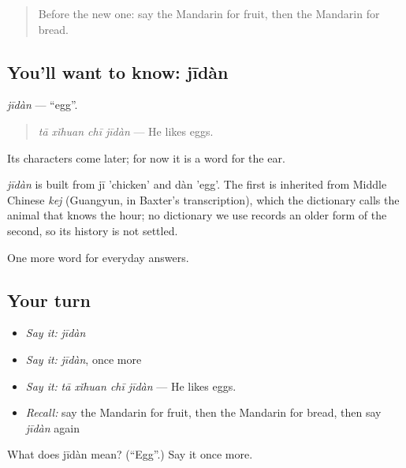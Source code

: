 \label{lesson:ZH-C40-jidan}



\begin{quote}
Before the new one: say the Mandarin for fruit, then the Mandarin for bread.
\end{quote}

\subsection*{You'll want to know: jīdàn}
\emph{jīdàn} — \textquotedblleft{}egg\textquotedblright{}.

\begin{quote}
\emph{tā xǐhuan chī jīdàn} — He likes eggs.
\end{quote}

Its characters come later; for now it is a word for the ear.

\begin{cousinweb}
\emph{jīdàn} is built from jī 'chicken' and dàn 'egg'. The first is inherited from Middle Chinese \emph{kej} (Guangyun, in Baxter's transcription), which the dictionary calls the animal that knows the hour; no dictionary we use records an older form of the second, so its history is not settled.
\end{cousinweb}

\begin{grammarlens}[title={What you've built}]
One more word for everyday answers.
\end{grammarlens}

\subsection*{Your turn}
\begin{itemize}
\raggedright
  \item \emph{Say it:} \emph{jīdàn}
  \item \emph{Say it:} \emph{jīdàn}, once more
  \item \emph{Say it:} \emph{tā xǐhuan chī jīdàn} — He likes eggs.
  \item \emph{Recall:} say the Mandarin for fruit, then the Mandarin for bread, then say \emph{jīdàn} again
\end{itemize}

\begin{tcolorbox}[breakable,colback=teal!4,colframe=teal!35!black,title={Before you move on}]
What does jīdàn mean? (\textquotedblleft{}Egg\textquotedblright{}.) Say it once more.
\end{tcolorbox}
